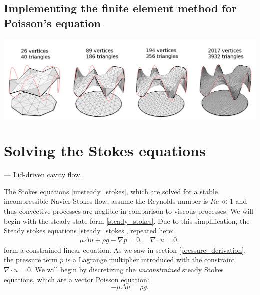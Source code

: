 \subsection{Implementing the finite element method for Poisson's equation}

\begin{center}
\includegraphics[width=\linewidth]{figures/laplace/laplace.png}
\end{center}


\section{Solving the Stokes equations}
--- Lid-driven cavity flow.

The Stokes equations \eqref{unsteady_stokes}, which are solved for a stable incompressible Navier-Stokes flow,
assume the Reynolds number is $Re \ll 1$ and thus convective processes are neglible in comparison to viscous processes.
We will begin with the steady-state form \eqref{steady_stokes}.
Due to this simplification, the Steady stokes equations \eqref{steady_stokes}, repeated here:
\begin{align*}
    \mu\Delta u + \rho g - \nabla p = 0,\quad \nabla\cdot u = 0,
\end{align*}
form a constrained linear equation. As we saw in section \ref{pressure_derivation}, the pressure term $p$ is a Lagrange multiplier introduced
with the constraint $\nabla\cdot u = 0$. We will begin by discretizing the \textit{unconstrained} steady Stokes equations,
which are a vector Poisson equation:
\begin{equation}\label{steady_stokes_unconstrained}
    -\mu\Delta u = \rho g.
\end{equation}
